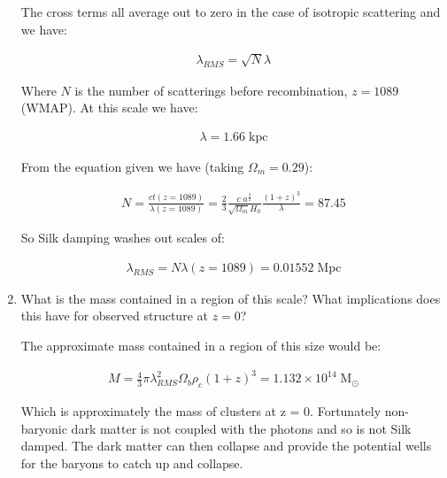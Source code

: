 \documentclass{article}
\def\beq{\begin{eqnarray}}
\def\eeq{\end{eqnarray}}
\begin{document}
\begin{enumerate}
  The cross terms all average out to zero in the case of isotropic scattering and we have:

  \beq
  \lambda_{RMS} = \sqrt{N} \lambda
  \eeq

  Where $N$ is the number of scatterings before recombination, $z = 1089$ (WMAP). At this scale we have:
  
  \beq
  \lambda = 1.66 \; \mathrm{kpc}
  \eeq

  From the equation given we have (taking $\Omega_m = 0.29$):

  \beq
  N = \frac{c t(z = 1089)}{\lambda(z = 1089)} = \frac{2}{3} \frac{c \; a^{\frac{3}{2}}}{\sqrt{\Omega_m} H_0} \frac{ (1 + z)^3 }{\lambda} = 87.45  
  \eeq

  So Silk damping washes out scales of:
  
  \beq
  \lambda_{RMS} = N \lambda(z = 1089) = 0.01552 \; \mathrm{Mpc}
  \eeq

  
\item What is the mass contained in a region of this scale? What implications does this have for observed structure at $z=0$?

  The approximate mass contained in a region of this size would be:

  \beq
  M = \frac{4}{3} \pi \lambda_{RMS}^2 \Omega_b \rho_c (1 + z)^3 = 1.132 \times 10^{14} \; \mathrm{M_{\odot}}
  \eeq

  Which is approximately the mass of clusters at z = 0. Fortunately non-baryonic dark matter is not coupled with the photons and so is not Silk damped. The dark matter can then collapse and provide the potential wells for the baryons to catch up and collapse.
  
\end{enumerate}
\end{document}
